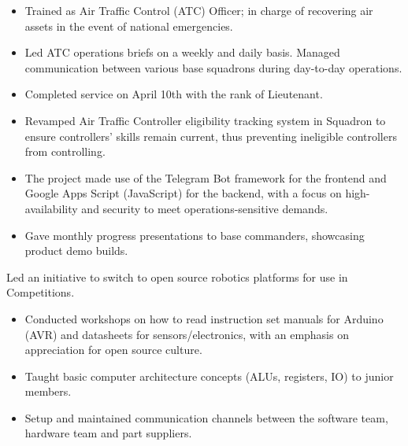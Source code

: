 \documentclass[10pt,a4paper,ragged2e,withhyper]{altacv}
\begin{document}
\begin{paracol}{2}
\divider

\begin{itemize}
\item Trained as Air Traffic Control (ATC) Officer; in charge of recovering air assets in the event of national emergencies.
\item Led ATC operations briefs on a weekly and daily basis. Managed communication between various base squadrons during day-to-day operations.
\item Completed service on April 10th with the rank of Lieutenant.
\end{itemize}

\divider




\begin{itemize}
\item Revamped Air Traffic Controller eligibility tracking system in Squadron to ensure controllers’ skills remain current, thus preventing ineligible controllers from controlling. 
\item The project made use of the Telegram Bot framework for the frontend and Google Apps Script (JavaScript) for the backend, with a focus on high-availability and security to meet operations-sensitive demands.
\item Gave monthly progress presentations to base commanders, showcasing product demo builds.
\end{itemize}

\divider

Led an initiative to switch to open source robotics platforms for use in Competitions. 
\medskip
\begin{itemize}
  \item Conducted workshops on how to read instruction set manuals for Arduino (AVR) and datasheets for sensors/electronics, with an emphasis on appreciation for open source culture.
  \item Taught basic computer architecture concepts (ALUs, registers, IO) to junior members.
  \item Setup and maintained communication channels between the software team, hardware team and part suppliers.
\end{itemize}


\end{paracol}
\end{document}
